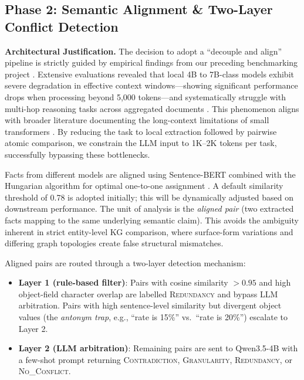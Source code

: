 \documentclass[11pt]{article}
\begin{document}
\subsection*{Phase 2: Semantic Alignment \& Two-Layer Conflict Detection}

\textbf{Architectural Justification.} The decision to adopt a ``decouple and align'' 
pipeline is strictly guided by empirical findings from our preceding benchmarking project \cite{yan2026benchmarking}.
Extensive evaluations revealed that local 4B to 7B-class models exhibit severe 
degradation in effective context windows---showing significant performance drops 
when processing beyond 5,000 tokens---and systematically struggle with multi-hop 
reasoning tasks across aggregated documents \cite{yan2026benchmarking}.
This phenomenon aligns with broader literature documenting the long-context limitations 
of small transformers \cite{kuratov2024babilong, wang2025longcontext}.
By reducing the task to local extraction followed by pairwise atomic comparison, we constrain 
the LLM input to 1K--2K tokens per task, successfully bypassing these bottlenecks.

Facts from different models are aligned using Sentence-BERT \cite{reimers2019sbert}
combined with the Hungarian algorithm for optimal one-to-one assignment \cite{schmidt2025dissecting}.
A default similarity threshold of 0.78 is adopted initially; this will be dynamically adjusted based on downstream performance.
The unit of analysis is the \textit{aligned pair} (two extracted facts mapping to the same underlying semantic claim). This avoids the ambiguity inherent in strict entity-level KG comparison, where surface-form variations and differing graph topologies create false structural mismatches.

Aligned pairs are routed through a two-layer detection mechanism:
\begin{itemize}[leftmargin=1.5em, itemsep=2pt]
    \item \textbf{Layer 1 (rule-based filter)}: Pairs with cosine
        similarity $> 0.95$ and high object-field character
        overlap are labelled \textsc{Redundancy} and bypass LLM arbitration.
        Pairs with high sentence-level similarity but
        divergent object values (the \textit{antonym trap},
        e.g., ``rate is 15\%'' vs.\ ``rate is 20\%'') escalate to Layer 2.
    \item \textbf{Layer 2 (LLM arbitration)}: Remaining pairs are sent
        to Qwen3.5-4B with a few-shot prompt
        returning \textsc{Contradiction}, \textsc{Granularity},
        \textsc{Redundancy}, or \textsc{No\_Conflict}.
\end{itemize}
\end{document}
